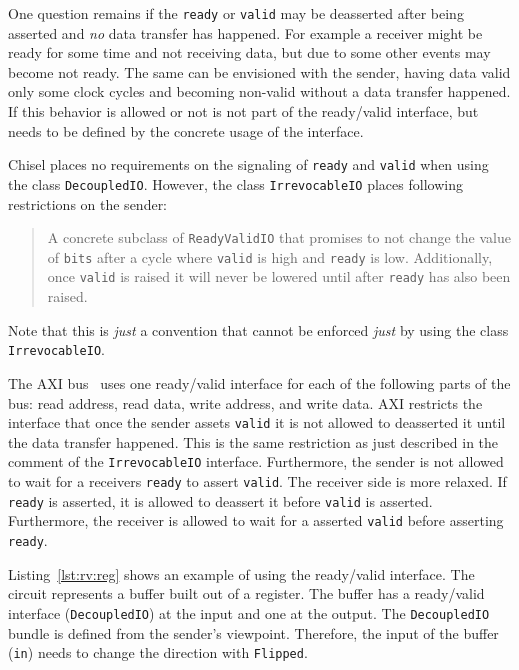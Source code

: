 \documentclass[%
    10pt,
    headinclude, footexclude,
    openright, %
    notitlepage,
    cleardoubleempty,
    headsepline,
    pointlessnumbers,
    bibtotoc, idxtotoc,
    ]{scrbook}
\newcommand{\code}[1]{{\lstinline[basicstyle=\small\ttfamily]{#1}}}
\begin{document}
One question remains if the \code{ready} or \code{valid} may be deasserted
after being asserted and \emph{no} data transfer has happened.
For example a receiver might be ready for some time and not receiving data, but
due to some other events may become not ready.
The same can be envisioned with the sender, having data valid only some
clock cycles and becoming non-valid without a data transfer happened.
If this behavior is allowed or not is not part of the ready/valid interface,
but needs to be defined by the concrete usage of the interface.

Chisel places no requirements on the signaling of \code{ready} and \code{valid}
when using the class \code{DecoupledIO}.
However, the class \code{IrrevocableIO} places following restrictions
on the sender:

\begin{quote}
A concrete subclass of \code{ReadyValidIO} that promises to not change
the value of \code{bits} after a cycle where \code{valid} is high and \code{ready} is low.
Additionally, once \code{valid} is raised it will never be lowered until after
\code{ready} has also been raised.
\end{quote}

\noindent Note that this is \emph{just} a convention that cannot be enforced \emph{just}
by using the class \code{IrrevocableIO}.

The AXI  bus~\cite{axi4standard} uses one ready/valid interface for each of the following parts of the bus:
read address, read data, write address, and write data. AXI restricts the interface
that once the sender assets \code{valid} it is not allowed to deasserted it
until the data transfer happened. This is the same restriction as just described
in the comment of the \code{IrrevocableIO} interface.
Furthermore, the sender is not allowed to wait for a receivers
\code{ready} to assert \code{valid}.
The receiver side is more relaxed. If \code{ready} is asserted, it is allowed to deassert it
before \code{valid} is asserted. Furthermore, the receiver is allowed to wait for a asserted
\code{valid} before asserting \code{ready}.


Listing~\ref{lst:rv:reg} shows an example of using the ready/valid interface.
The circuit represents a buffer built out of a register.
The buffer has a ready/valid interface (\code{DecoupledIO}) at the input and one at the output.
The \code{DecoupledIO} bundle is defined from the sender's viewpoint. Therefore,
the input of the buffer (\code{in}) needs to change the direction with \code{Flipped}.
\end{document}
